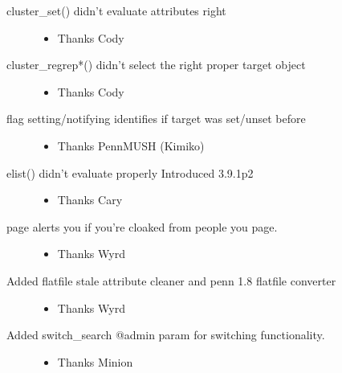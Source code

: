\documentclass[letterpaper,10pt,english]{sphinxmanual}
\begin{document}
\begin{description}
\begin{itemize}
\end{itemize}

\item[{cluster\_set() didn’t evaluate attributes right}] \leavevmode\begin{itemize}
\item {} 
\sphinxAtStartPar
Thanks Cody

\end{itemize}

\item[{cluster\_regrep*() didn’t select the right proper target object}] \leavevmode\begin{itemize}
\item {} 
\sphinxAtStartPar
Thanks Cody

\end{itemize}

\item[{flag setting/notifying identifies if target was set/unset before}] \leavevmode\begin{itemize}
\item {} 
\sphinxAtStartPar
Thanks PennMUSH (Kimiko)

\end{itemize}

\item[{elist() didn’t evaluate properly \sphinxhyphen{} Introduced 3.9.1p2}] \leavevmode\begin{itemize}
\item {} 
\sphinxAtStartPar
Thanks Cary

\end{itemize}

\item[{page alerts you if you’re cloaked from people you page.}] \leavevmode\begin{itemize}
\item {} 
\sphinxAtStartPar
Thanks Wyrd

\end{itemize}

\item[{Added flatfile stale attribute cleaner and penn 1.8 flatfile converter}] \leavevmode\begin{itemize}
\item {} 
\sphinxAtStartPar
Thanks Wyrd

\end{itemize}

\item[{Added switch\_search @admin param for switching functionality.}] \leavevmode\begin{itemize}
\item {} 
\sphinxAtStartPar
Thanks Minion


\end{itemize}
\end{description}
\end{document}
